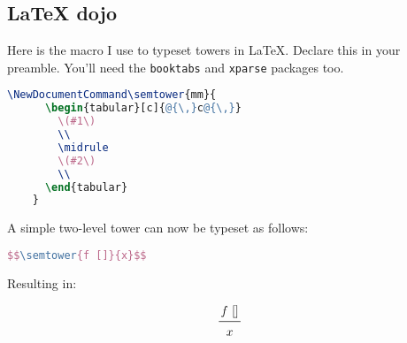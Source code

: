 \documentclass[nols,twoside,nofonts,nobib,nohyper,showframe]{tufte-handout}
\begin{document}
\begin{appendices}


  \section{{\LaTeX} dojo}

  Here is the macro I use to typeset towers in \LaTeX. Declare this in your
  preamble. You'll need the \texttt{booktabs} and \texttt{xparse} packages too.

  \begin{lstlisting}[language=TeX]
    \NewDocumentCommand\semtower{mm}{
      \begin{tabular}[c]{@{\,}c@{\,}}
        \(#1\)
        \\
        \midrule
        \(#2\)
        \\
      \end{tabular}
    }
  \end{lstlisting}

 A simple two-level tower can now be typeset as follows:

    \begin{lstlisting}[language=TeX]
      $$\semtower{f []}{x}$$
  \end{lstlisting}

  Resulting in:

  $$\semtower{f []}{x}$$

  \end{appendices}
\end{document}
